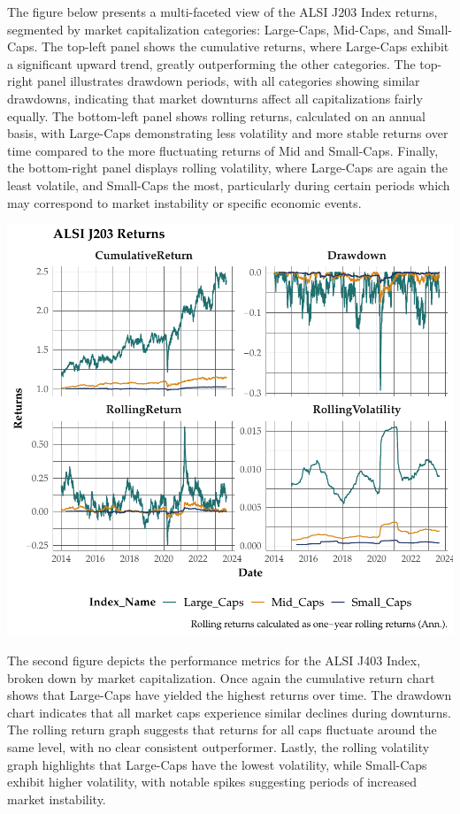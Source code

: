 \documentclass[11pt,preprint, authoryear]{elsarticle}
\numberwithin{equation}{section}
\numberwithin{figure}{section}
\numberwithin{table}{section}
\begin{document}
The figure below presents a multi-faceted view of the ALSI J203 Index
returns, segmented by market capitalization categories: Large-Caps,
Mid-Caps, and Small-Caps. The top-left panel shows the cumulative
returns, where Large-Caps exhibit a significant upward trend, greatly
outperforming the other categories. The top-right panel illustrates
drawdown periods, with all categories showing similar drawdowns,
indicating that market downturns affect all capitalizations fairly
equally. The bottom-left panel shows rolling returns, calculated on an
annual basis, with Large-Caps demonstrating less volatility and more
stable returns over time compared to the more fluctuating returns of Mid
and Small-Caps. Finally, the bottom-right panel displays rolling
volatility, where Large-Caps are again the least volatile, and
Small-Caps the most, particularly during certain periods which may
correspond to market instability or specific economic events.

\includegraphics{Question-3_files/figure-latex/203roll-ret-1.pdf}

The second figure depicts the performance metrics for the ALSI J403
Index, broken down by market capitalization. Once again the cumulative
return chart shows that Large-Caps have yielded the highest returns over
time. The drawdown chart indicates that all market caps experience
similar declines during downturns. The rolling return graph suggests
that returns for all caps fluctuate around the same level, with no clear
consistent outperformer. Lastly, the rolling volatility graph highlights
that Large-Caps have the lowest volatility, while Small-Caps exhibit
higher volatility, with notable spikes suggesting periods of increased
market instability.
\end{document}
